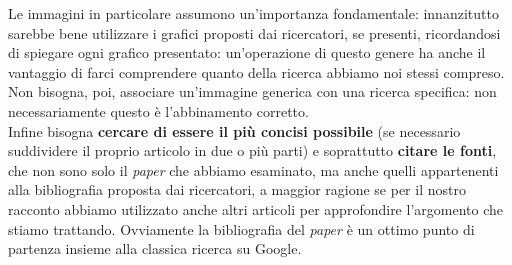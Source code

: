 \documentclass[12pt,a4paper]{article}
\begin{document}
 Le immagini in particolare assumono un'importanza fondamentale: innanzitutto sarebbe bene utilizzare i grafici proposti dai ricercatori, se presenti, ricordandosi di spiegare ogni grafico presentato: un'operazione di questo genere ha anche il vantaggio di farci comprendere quanto della ricerca abbiamo noi stessi compreso. Non bisogna, poi, associare un'immagine generica con una ricerca specifica: non necessariamente questo è l'abbinamento corretto.\\
 Infine bisogna \textbf{cercare di essere il più concisi possibile} (se necessario suddividere il proprio articolo in due o più parti) e soprattutto \textbf{citare le fonti}, che non sono solo il \emph{paper} che abbiamo esaminato, ma anche quelli appartenenti alla bibliografia proposta dai ricercatori, a maggior ragione se per il nostro racconto abbiamo utilizzato anche altri articoli per approfondire l'argomento che stiamo trattando. Ovviamente la bibliografia del \emph{paper} è un ottimo punto di partenza insieme alla classica ricerca su Google.
\end{document}
